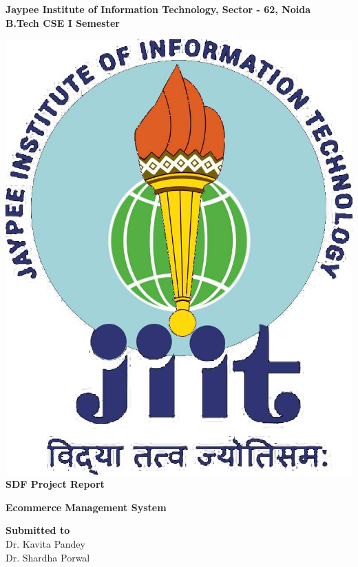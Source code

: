 \documentclass[12pt,a4paper]{article}
\begin{document}
\begin{titlepage}
    \centering
    
    \Huge
    \textbf{Jaypee Institute of Information Technology, Sector - 62, Noida } \\
    \vspace{0.5cm}
    \Large
    \textbf{B.Tech CSE I Semester}\\
    \vspace{1cm}
    \vspace*{\fill}
    
    \includegraphics[scale=0.2]{jiit_logo}\\
    
    \vspace{1.5cm}
    \Huge
    \textbf{SDF Project Report}\\
    \Large
    
    \textbf{Ecommerce Management System}\\
    \vspace{1cm}

    \Large
    \textbf{Submitted to}\\
    Dr. Kavita Pandey\\
    Dr. Shardha Porwal\\
    \vspace{1cm}


\end{titlepage}
\end{document}
